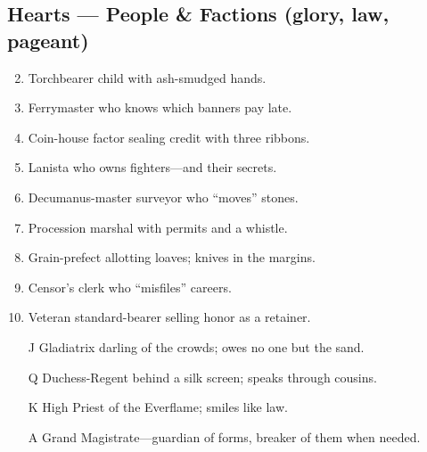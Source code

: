 \subsection*{Hearts --- People \& Factions (glory, law, pageant)}
\label{sec:ecktoria-people}
\begin{enumerate}
\setcounter{enumi}{1}
\item Torchbearer child with ash-smudged hands.
\item Ferrymaster who knows which banners pay late.
\item Coin-house factor sealing credit with three ribbons.
\item Lanista who owns fighters---and their secrets.
\item Decumanus-master surveyor who ``moves'' stones.
\item Procession marshal with permits and a whistle.
\item Grain-prefect allotting loaves; knives in the margins.
\item Censor's clerk who ``misfiles'' careers.
\item Veteran standard-bearer selling honor as a retainer.
\item[J] Gladiatrix darling of the crowds; owes no one but the sand.
\item[Q] Duchess-Regent behind a silk screen; speaks through cousins.
\item[K] High Priest of the Everflame; smiles like law.
\item[A] Grand Magistrate---guardian of forms, breaker of them when needed.
\end{enumerate}

